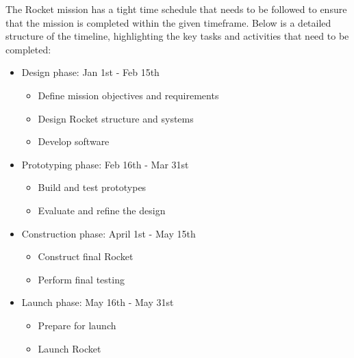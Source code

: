 The Rocket mission has a tight time schedule that needs to be followed to ensure that the mission is completed within the given timeframe. Below is a detailed structure of the timeline, highlighting the key tasks and activities that need to be completed:

\begin{itemize}
    \item Design phase: Jan 1st - Feb 15th
        \begin{itemize}
            \item Define mission objectives and requirements
            \item Design Rocket structure and systems
            \item Develop software
        \end{itemize}
    \item Prototyping phase: Feb 16th - Mar 31st
        \begin{itemize}
            \item Build and test prototypes
            \item Evaluate and refine the design
        \end{itemize}
    \item Construction phase: April 1st - May 15th
        \begin{itemize}
            \item Construct final Rocket
            \item Perform final testing
        \end{itemize}
    \item Launch phase: May 16th - May 31st
        \begin{itemize}
            \item Prepare for launch
            \item Launch Rocket
        \end{itemize}
\end{itemize}